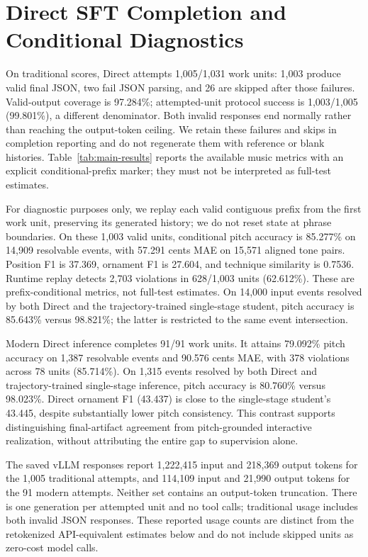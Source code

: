 \section{Direct SFT Completion and Conditional Diagnostics}
\label{sec:direct-results}

On traditional scores, Direct attempts 1,005/1,031 work units: 1,003 produce valid final JSON, two fail JSON parsing, and 26 are skipped after those failures. Valid-output coverage is 97.284\%; attempted-unit protocol success is 1,003/1,005 (99.801\%), a different denominator. Both invalid responses end normally rather than reaching the output-token ceiling. We retain these failures and skips in completion reporting and do not regenerate them with reference or blank histories. Table~\ref{tab:main-results} reports the available music metrics with an explicit conditional-prefix marker; they must not be interpreted as full-test estimates.

For diagnostic purposes only, we replay each valid contiguous prefix from the first work unit, preserving its generated history; we do not reset state at phrase boundaries. On these 1,003 valid units, conditional pitch accuracy is 85.277\% on 14,909 resolvable events, with 57.291 cents MAE on 15,571 aligned tone pairs. Position F1 is 37.369, ornament F1 is 27.604, and technique similarity is 0.7536. Runtime replay detects 2,703 violations in 628/1,003 units (62.612\%). These are prefix-conditional metrics, not full-test estimates. On 14,000 input events resolved by both Direct and the trajectory-trained single-stage student, pitch accuracy is 85.643\% versus 98.821\%; the latter is restricted to the same event intersection.

Modern Direct inference completes 91/91 work units. It attains 79.092\% pitch accuracy on 1,387 resolvable events and 90.576 cents MAE, with 378 violations across 78 units (85.714\%). On 1,315 events resolved by both Direct and trajectory-trained single-stage inference, pitch accuracy is 80.760\% versus 98.023\%. Direct ornament F1 (43.437) is close to the single-stage student's 43.445, despite substantially lower pitch consistency. This contrast supports distinguishing final-artifact agreement from pitch-grounded interactive realization, without attributing the entire gap to supervision alone.

The saved vLLM responses report 1,222,415 input and 218,369 output tokens for the 1,005 traditional attempts, and 114,109 input and 21,990 output tokens for the 91 modern attempts. Neither set contains an output-token truncation. There is one generation per attempted unit and no tool calls; traditional usage includes both invalid JSON responses. These reported usage counts are distinct from the retokenized API-equivalent estimates below and do not include skipped units as zero-cost model calls.

